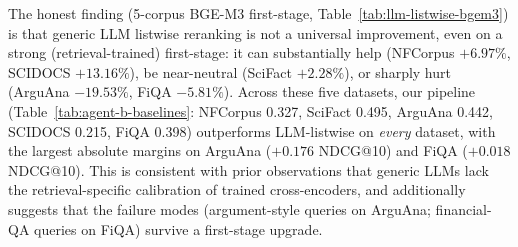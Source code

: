 
The honest finding (5-corpus BGE-M3 first-stage, Table~\ref{tab:llm-listwise-bgem3}) is that generic LLM listwise reranking is not a universal improvement, even on a strong (retrieval-trained) first-stage: it can substantially help (NFCorpus $+6.97\%$, SCIDOCS $+13.16\%$), be near-neutral (SciFact $+2.28\%$), or sharply hurt (ArguAna $-19.53\%$, FiQA $-5.81\%$). Across these five datasets, our pipeline (Table~\ref{tab:agent-b-baselines}: NFCorpus 0.327, SciFact 0.495, ArguAna 0.442, SCIDOCS 0.215, FiQA 0.398) outperforms LLM-listwise on \emph{every} dataset, with the largest absolute margins on ArguAna ($+0.176$ NDCG@10) and FiQA ($+0.018$ NDCG@10). This is consistent with prior observations that generic LLMs lack the retrieval-specific calibration of trained cross-encoders, and additionally suggests that the failure modes (argument-style queries on ArguAna; financial-QA queries on FiQA) survive a first-stage upgrade.

